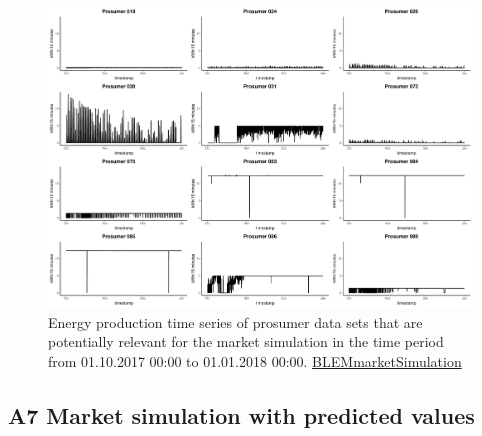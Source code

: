 \begin{figure}[H]
    \centering
    \includegraphics[width=\textwidth]{thesis/graphs/marketsimulation/producers_all.pdf}
    \caption[Energy production time series of prosumers relevant for market simulation]{Energy production time series of prosumer data sets that are potentially relevant for the market simulation in the time period from 01.10.2017 00:00 to 01.01.2018 00:00. \quantnet\href{https://github.com/QuantLet/BLEM/tree/master/BLEMmarketSimulation}{BLEMmarketSimulation}}
\end{figure}


\newpage
\subsection*{\hypertarget{AppA7:Figures:marketsimulation_pred}{A7} Market simulation with predicted values}\label{AppA7:Figures:marketsimulation_pred}

